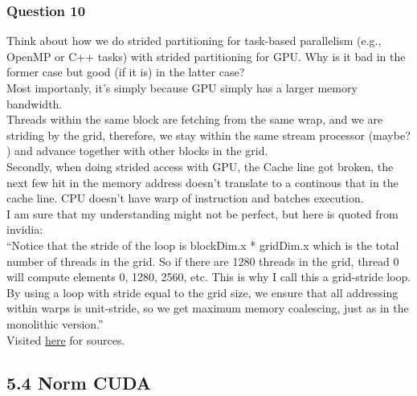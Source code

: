\documentclass[]{article}
\begin{document}
        \subsubsection*{Question 10}
            Think about how we do strided partitioning for task-based parallelism (e.g., OpenMP or C++ tasks) with strided partitioning for GPU. Why is it bad in the former case but good (if it is) in the latter case?
            \\[1.1em]
            Most importanly, it's simply because GPU simply has a larger memory bandwidth. 
            \\
            Threads within the same block are fetching from the same wrap, and we are striding by the grid, therefore, we stay within the same stream processor (maybe? ) and advance together with other blocks in the grid. 
            \\
            Secondly, when doing strided access with GPU, the Cache line got broken, the next few hit in the memory address doesn't translate to a continous that in the cache line. CPU doesn't have warp of instruction and batches execution.
            \\
            I am sure that my understanding might not be perfect, but here is quoted from invidia: 
            \\[1.1em] 
            ``Notice that the stride of the loop is blockDim.x * gridDim.x which is the total number of threads in the grid. So if there are 1280 threads in the grid, thread 0 will compute elements 0, 1280, 2560, etc. This is why I call this a grid-stride loop. By using a loop with stride equal to the grid size, we ensure that all addressing within warps is unit-stride, so we get maximum memory coalescing, just as in the monolithic version.''
            \\[1.1em]
            Visited \href{https://developer.nvidia.com/blog/cuda-pro-tip-write-flexible-kernels-grid-stride-loops/}{here} for sources. 
    \subsection*{5.4 Norm CUDA}
\end{document}
